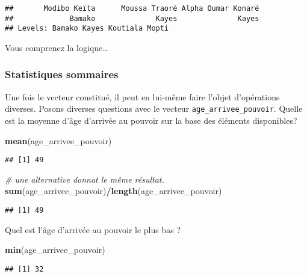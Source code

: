 \documentclass[]{book}
\newenvironment{Shaded}{\begin{snugshade}}{\end{snugshade}}
\newcommand{\KeywordTok}[1]{\textcolor[rgb]{0.13,0.29,0.53}{\textbf{#1}}}
\newcommand{\CommentTok}[1]{\textcolor[rgb]{0.56,0.35,0.01}{\textit{#1}}}
\newcommand{\OperatorTok}[1]{\textcolor[rgb]{0.81,0.36,0.00}{\textbf{#1}}}
\newcommand{\NormalTok}[1]{#1}
\begin{document}
\begin{verbatim}
##       Modibo Keïta      Moussa Traoré Alpha Oumar Konaré 
##             Bamako              Kayes              Kayes 
## Levels: Bamako Kayes Koutiala Mopti
\end{verbatim}

Vous comprenez la logique\ldots{}

\subsubsection{Statistiques sommaires}\label{statistiques-sommaires}

Une fois le vecteur constitué, il peut en lui-même faire l'objet
d'opérations diverses. Posons diverses questions avec le vecteur
\texttt{age\_arrivee\_pouvoir}. Quelle est la moyenne d'âge d'arrivée au
pouvoir sur la base des éléments disponibles?

\begin{Shaded}
\begin{Highlighting}[]
\KeywordTok{mean}\NormalTok{(age_arrivee_pouvoir)}
\end{Highlighting}
\end{Shaded}

\begin{verbatim}
## [1] 49
\end{verbatim}

\begin{Shaded}
\begin{Highlighting}[]
\CommentTok{# une alternative donnat le même résultat.}
\KeywordTok{sum}\NormalTok{(age_arrivee_pouvoir)}\OperatorTok{/}\KeywordTok{length}\NormalTok{(age_arrivee_pouvoir)}
\end{Highlighting}
\end{Shaded}

\begin{verbatim}
## [1] 49
\end{verbatim}

Quel est l'âge d'arrivée au pouvoir le plus bas ?

\begin{Shaded}
\begin{Highlighting}[]
\KeywordTok{min}\NormalTok{(age_arrivee_pouvoir)}
\end{Highlighting}
\end{Shaded}

\begin{verbatim}
## [1] 32
\end{verbatim}
\end{document}
